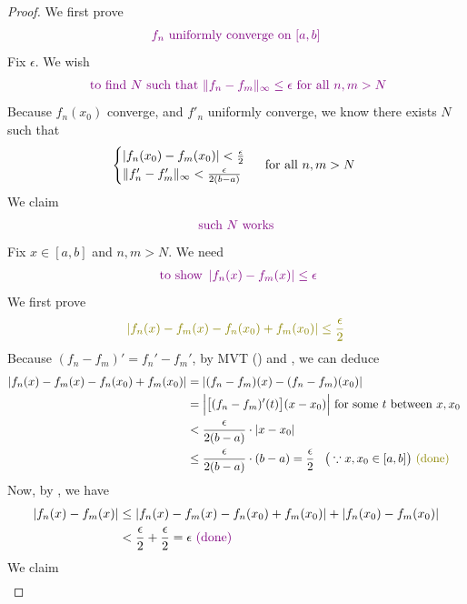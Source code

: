 \documentclass{report}
\begin{document}
\begin{proof}
We first prove 
\begin{align}
\label{fnun}
\textcolor{violet}{f_n\text{ uniformly converge on $[a,b]$}}
\end{align}
Fix $\epsilon $. We wish  
\begin{align*}
  \textcolor{violet}{\text{ to find $N$ such that $\| f_n-f_m \|_\infty \leq \epsilon $ for all $n,m>N$}}
\end{align*}
Because $f_n(x_0)$ converge, and $f'_n$ uniformly converge, we know there exists $N$ such that 
 \begin{align}
\label{UCD1}
\begin{cases}
 \left|f_n(x_0)-f_m(x_0)\right|<\frac{\epsilon}{2} \\
\| f_n'-f_m' \|_\infty <\frac{\epsilon }{2(b-a)}
\end{cases}\text{ for all $n,m>N$ }
\end{align}
We claim 
\begin{align*}
\textcolor{violet}{\text{ such $N$ works }}
\end{align*}
Fix $x \in [a,b]$ and $n,m>N$. We need
\begin{align*}
  \textcolor{violet}{\text{ to show }\left|f_n(x)-f_m(x)\right|\leq \epsilon}
\end{align*}
We first prove
\begin{align*}
\olive{\abso{f_n(x)-f_m(x)-f_n(x_0)+f_m(x_0)}\leq \frac{\epsilon}{2}}
\end{align*}
Because $(f_n-f_m)'=f_n'-f_m'$, by MVT () and , we can deduce 
\begin{align*}
 \abso{f_n(x)-f_m(x)-f_n(x_0)+f_m(x_0)}&=\abso{(f_n-f_m)(x)-(f_n-f_m)(x_0)}\\
 &=\Big|\big[(f_n-f_m)'(t)\big](x-x_0)\Big|\text{ for some $t$ between $x,x_0$ }\\
 &< \frac{\epsilon}{2(b-a)}\cdot \abso{x-x_0}\\
 &\leq \frac{\epsilon }{2(b-a)}\cdot (b-a)=\frac{\epsilon}{2}\hspace{0.3cm}\big(\because x,x_0  \in [a,b]\big)\odone
\end{align*}
Now, by , we have 
\begin{align*}
  \left|f_n(x)-f_m(x)\right|&\leq \left|f_n(x)-f_m(x)-f_n(x_0)+f_m(x_0)\right|+\left|f_n(x_0)-f_m(x_0)\right|\\
&<\frac{\epsilon}{2}+\frac{\epsilon}{2}=\epsilon \textcolor{violet}{\text{ (done) }}
\end{align*}
We claim 
\begin{align}
\label{UCAC2}

\end{align}
\end{proof}
\end{document}
